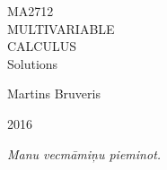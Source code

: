 \documentclass[a4paper, 11pt]{article}
\begin{document}

\begin{titlepage}

\newlength{\dropp}
\setlength{\dropp}{0.1\textheight}
\vspace*{1.5\dropp}
\centering

{\fontsize{24}{24}\rmfamily\selectfont MA2712} \\%
{\color{Red} \fontsize{60}{60}\rmfamily\selectfont 
MULTIVARIABLE \\[12pt]
CALCULUS} \\[24pt]
{\fontsize{24}{24}\rmfamily Solutions }\par
\vfill
{\fontsize{18}{18}\rmfamily Martins Bruveris}\par
\vfill
{\scshape 2016}\par
\vspace*{\dropp}
\end{titlepage}
\addtocounter{page}{1}

\null\thispagestyle{empty}\newpage


\thispagestyle{empty}
{}

\vspace*{6cm}


\begin{center}
\Large\itshape
Manu vecmāmiņu pieminot.%
\end{center}

\newpage\null\thispagestyle{empty}\newpage


\thispagestyle{firstpage}

\vspace*{3cm}

\tableofcontents

\newpage\null\thispagestyle{empty}\newpage

\end{document}

